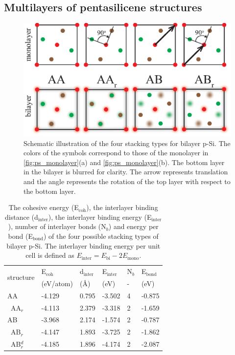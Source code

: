 \subsection{Multilayers of pentasilicene structures}\label{fews}

\begin{figure}[htb]
\centering
\includegraphics[width=0.8\linewidth]{ps_stackings.eps}%
\caption{ Schematic illustration of the four stacking types for bilayer p-Si. The colors of the symbols correspond to those of the monolayer in \autoref{fig:ps_monolayer}(a) and \autoref{fig:ps_monolayer}(b). The bottom layer in the bilayer is blurred for clarity. The arrow represents translation and the angle represents the rotation of the top layer with respect to the bottom layer. \label{fig:ps_stackings}}
\end{figure}

\begin{table}[htb]
\centering
\caption{The cohesive energy (E$_{\text{coh}}$), the interlayer binding distance (d$_{\text{inter}}$), the interlayer binding energy (E$_{\text{inter}}$), number of interlayer bonds (N$_b$) and energy per bond (E$_{\text{bond}}$) of the four possible stacking types of bilayer p-Si. The interlayer binding energy per unit cell is defined as $E_{\text{inter}}=E_{\text{bi}}-2E_{\text{mono}}$. \label{bilayer_table}}
\begin{tabularx}{\textwidth}{@{\extracolsep{\fill}}X|XXXXX}
\hline\hline
\multirow{2}{*}{structure}  & E$_{\text{coh}}$ & d$_{\text{inter}}$ & E$_{\text{inter}}$& N$_b$ & E$_{\text{bond}}$ \\ 
 & (eV/atom) & (\AA) & (eV) & - & (eV) \\ \hline
AA & -4.129 & 0.795   & -3.502  & 4 & -0.875 \\
~AA$_r$ & -4.113 & 2.379   & -3.318  & 2 & -1.659 \\
AB & -3.968 & 2.174   & -1.574  & 2 & -0.787 \\
~AB$_r$ & -4.147 & 1.893   & -3.725  & 2 & -1.862 \\
~AB$_r^d$ & -4.185 & 1.896   & -4.174  & 2 & -2.087 \\ 
\hline\hline
\end{tabularx}
\end{table}

